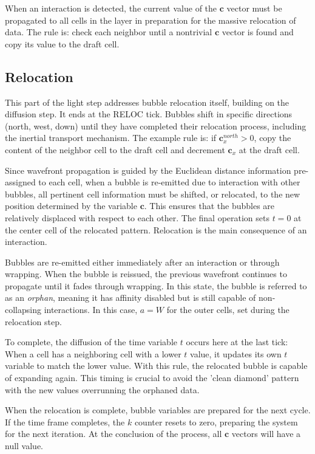 \documentclass[12pt]{article}
\begin{document}
When an interaction is detected, the current value of the \(\mathbf{c}\) vector must be propagated to all cells in the layer in preparation for the massive relocation of data. The rule is: check each neighbor until a nontrivial \(\mathbf{c}\) vector is found and copy its value to the draft cell.

\subsection{Relocation} \label{subsec:relocation}
This part of the light step addresses bubble relocation itself, building on the diffusion step. It ends at the RELOC tick. Bubbles shift in specific directions (north, west, down) until they have completed their relocation process, including the inertial transport mechanism. The example rule is: if $\textbf{c}_x^{north}>0$, copy the content of the neighbor cell to the draft cell and decrement $\textbf{c}_x$ at the draft cell.

Since wavefront propagation is guided by the Euclidean distance information pre-assigned to each cell, when a bubble is re-emitted due to interaction with other bubbles, all pertinent cell information must be shifted, or relocated, to the new position determined by the variable $\textbf{c}$. This ensures that the bubbles are relatively displaced with respect to each other. The final operation sets $t=0$ at the center cell of the relocated pattern. Relocation is the main consequence of an interaction.

Bubbles are re-emitted either immediately after an interaction or through wrapping. When the bubble is reissued, the previous wavefront continues to propagate until it fades through wrapping. In this state, the bubble is referred to as an \textit{orphan}, meaning it has affinity disabled but is still capable of non-collapsing interactions. In this case, $a=W$ for the outer cells, set during the relocation step. 

To complete, the diffusion of the time variable $t$ occurs here at the last tick: When a cell has a neighboring cell with a lower $t$ value, it updates its own $t$ variable to match the lower value. With this rule, the relocated bubble is capable of expanding again. This timing is crucial to avoid the 'clean diamond' pattern with the new values overrunning the orphaned data.

When the relocation is complete, bubble variables are prepared for the next cycle. If the time frame completes, the $k$ counter resets to zero, preparing the system for the next iteration.  At the conclusion of the process, all $\boldsymbol{c}$ vectors will have a null value.
\end{document}
